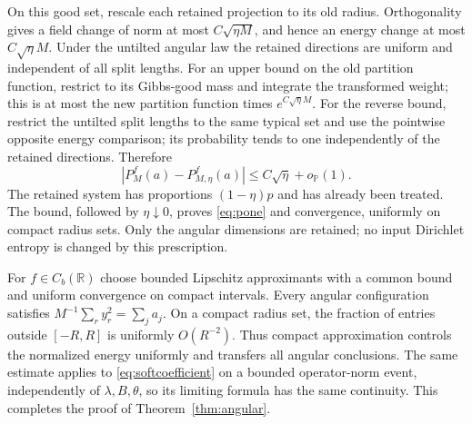 \documentclass[11pt]{article}
\numberwithin{equation}{section}
\theoremstyle{definition}
\newcommand{\Pbb}{\mathbb P}
\newcommand{\R}{\mathbb R}
\begin{document}
On this good set, rescale each retained projection to its old radius. Orthogonality gives a field change of norm at most $C\sqrt{\eta M}$, and hence an energy change at most $C\sqrt\eta M$. Under the untilted angular law the retained directions are uniform and independent of all split lengths. For an upper bound on the old partition function, restrict to its Gibbs-good mass and integrate the transformed weight; this is at most the new partition function times $e^{C\sqrt\eta M}$. For the reverse bound, restrict the untilted split lengths to the same typical set and use the pointwise opposite energy comparison; its probability tends to one independently of the retained directions. Therefore
\[
|P_M^f(a)-P_{M,\eta}^f(a)|\le C\sqrt\eta+o_{\Pbb}(1).
\]
The retained system has proportions $(1-\eta)p$ and has already been treated. The bound, followed by $\eta\downarrow0$, proves \eqref{eq:pone} and convergence, uniformly on compact radius sets. Only the angular dimensions are retained; no input Dirichlet entropy is changed by this prescription.

For $f\in C_b(\R)$ choose bounded Lipschitz approximants with a common bound and uniform convergence on compact intervals. Every angular configuration satisfies $M^{-1}\sum_ry_r^2=\sum_ja_j$. On a compact radius set, the fraction of entries outside $[-R,R]$ is uniformly $O(R^{-2})$. Thus compact approximation controls the normalized energy uniformly and transfers all angular conclusions. The same estimate applies to \eqref{eq:softcoefficient} on a bounded operator-norm event, independently of $\lambda,B,\theta$, so its limiting formula has the same continuity. This completes the proof of Theorem~\ref{thm:angular}.
\end{document}
